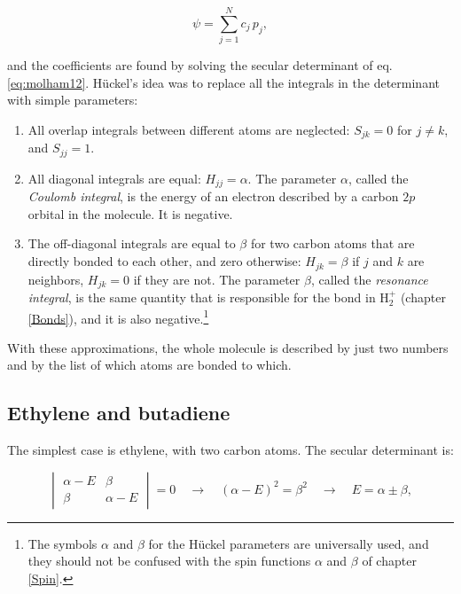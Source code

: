 \documentclass[
  english,
  9pt,
]{extbook}
\providecommand{\tightlist}{%
  \setlength{\itemsep}{0pt}\setlength{\parskip}{0pt}}
\theoremstyle{definition}
\theoremstyle{definition}
\theoremstyle{definition}
\theoremstyle{definition}
\theoremstyle{remark}
\begin{document}
\begin{equation}
\psi = \sum_{j=1}^N c_j\, p_j,
\label{eq:huckel1}
\end{equation}

and the coefficients are found by solving the secular determinant of eq. \eqref{eq:molham12}. Hückel's idea was to replace all the integrals in the determinant with simple parameters:

\begin{enumerate}
\def\labelenumi{\arabic{enumi}.}
\tightlist
\item
  All overlap integrals between different atoms are neglected: \(S_{jk}=0\) for \(j\neq k\), and \(S_{jj}=1\).
\item
  All diagonal integrals are equal: \(H_{jj}=\alpha\). The parameter \(\alpha\), called the \emph{Coulomb integral}, is the energy of an electron described by a carbon \(2p\) orbital in the molecule. It is negative.
\item
  The off-diagonal integrals are equal to \(\beta\) for two carbon atoms that are directly bonded to each other, and zero otherwise: \(H_{jk}=\beta\) if \(j\) and \(k\) are neighbors, \(H_{jk}=0\) if they are not. The parameter \(\beta\), called the \emph{resonance integral}, is the same quantity that is responsible for the bond in \(\mathrm{H}_2^+\) (chapter \ref{Bonds}), and it is also negative.\footnote{The symbols \(\alpha\) and \(\beta\) for the Hückel parameters are universally used, and they should not be confused with the spin functions \(\alpha\) and \(\beta\) of chapter \ref{Spin}.}
\end{enumerate}

With these approximations, the whole molecule is described by just two numbers and by the list of which atoms are bonded to which.

\subsection{Ethylene and butadiene}\label{ethylene-and-butadiene}

The simplest case is ethylene, with two carbon atoms. The secular determinant is:

\begin{equation}
\begin{vmatrix}
\alpha-E & \beta \\
\beta & \alpha-E
\end{vmatrix}=0
\quad\longrightarrow\quad (\alpha-E)^2 = \beta^2 \quad\longrightarrow\quad E=\alpha\pm\beta,
\label{eq:huckel2}
\end{equation}
\end{document}
